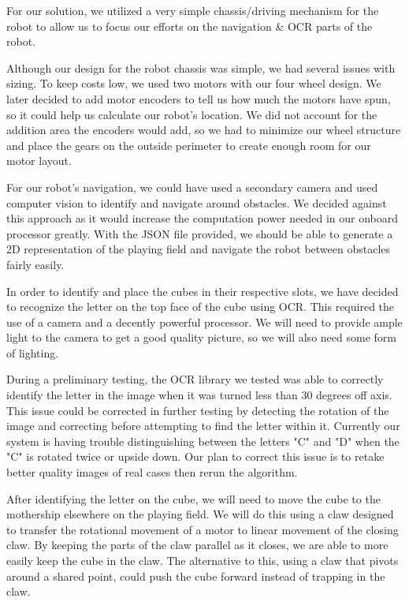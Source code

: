 \documentclass[12pt]{article}
\begin{document}
	For our solution, we utilized a very simple chassis/driving mechanism for the robot to allow us to focus our efforts on the navigation \& OCR parts of the robot.

Although our design for the robot chassis was simple, we had several issues with sizing. To keep costs low, we used two motors with our four wheel design. We later decided to add motor encoders to tell us how much the motors have spun, so it could help us calculate our robot's location. We did not account for the addition area the encoders would add, so we had to minimize our wheel structure and place the gears on the outside perimeter to create enough room for our motor layout.

For our robot’s navigation, we could have used a secondary camera and used computer vision to identify and navigate around obstacles. We decided against this approach as it would increase the computation power needed in our onboard processor greatly. With the JSON file provided, we should be able to generate a 2D representation of the playing field and navigate the robot between obstacles fairly easily. 

In order to identify and place the cubes in their respective slots, we have decided to recognize the letter on the top face of the cube using OCR. This required the use of a camera and a decently powerful processor. We will need to provide ample light to the camera to get a good quality picture, so we will also need some form of lighting. 

During a preliminary testing, the OCR library we tested was able to correctly identify the letter in the image when it was turned less than 30 degrees off axis. This issue could be corrected in further testing by detecting the rotation of the image and correcting before attempting to find the letter within it. Currently our system is having trouble distinguishing between the letters "C" and "D" when the "C" is rotated twice or upside down. Our plan to correct this issue is to retake better quality images of real cases then rerun the algorithm.

After identifying the letter on the cube, we will need to move the cube to the mothership elsewhere on the playing field. We will do this using a claw designed to transfer the rotational movement of a motor to linear movement of the closing claw. By keeping the parts of the claw parallel as it closes, we are able to more easily keep the cube in the claw. The alternative to this, using a claw that pivots around a shared point, could push the cube forward instead of trapping in the claw.
\end{document}
